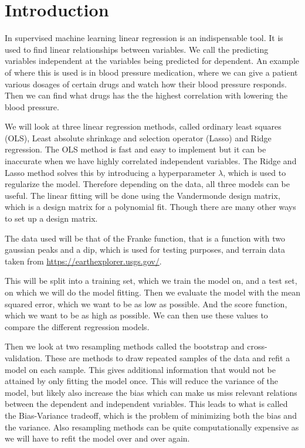 \section{Introduction}
In supervised machine learning linear regression is an indispensable tool. It is used to find linear relationships between variables. We call the predicting variables independent at the variables being predicted for dependent. An example of where this is used is in blood pressure medication, where we can give a patient various dosages of certain drugs and watch how their blood pressure responds. Then we can find what drugs has the the highest correlation with lowering the blood pressure. 

We will look at three linear regression methods, called ordinary least squares (OLS), Least absolute shrinkage and selection operator (Lasso) and Ridge regression. The OLS method is fast and easy to implement but it can be inaccurate when we have highly correlated independent variables. The Ridge and Lasso method solves this by introducing a hyperparameter $\lambda$, which is used to regularize the model. Therefore depending on the data, all three models can be useful. The linear fitting will be done using the Vandermonde design matrix, which is a design matrix for a polynomial fit. Though there are many other ways to set up a design matrix.

The data used will be that of the Franke function, that is a function with two gaussian peaks and a dip, which is used for testing purposes, and terrain data taken from \href{https://earthexplorer.usgs.gov/}{https://earthexplorer.usgs.gov/}. 

This will be split into a training set, which we train the model on, and a test set, on which we will do the model fitting. Then we evaluate the model with the mean squared error, which we want to be as low as possible. And the score function, which we want to be as high as possible. We can then use these values to compare the different regression models.

Then we look at two resampling methods called the bootstrap and cross-validation. These are methods to draw repeated samples of the data and refit a model on each sample. This gives additional information that would not be attained by only fitting the model once. This will reduce the variance of the model, but likely also increase the bias which can make us miss relevant relations between the dependent and independent variables. This leads to what is called the Bias-Variance tradeoff, which is the problem of minimizing both the bias and the variance. Also resampling methods can be quite computationally expensive as we will have to refit the model over and over again.
